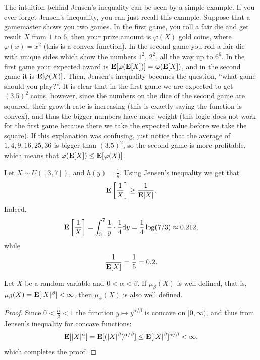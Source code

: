\documentclass[11pt,a4paper]{article}
\begin{document}
\begin{remark}
  The intuition behind Jensen's inequality can be seen by a simple
  example.
  If you ever forget Jensen's inequality, you can just recall this example.
  Suppose that a gamemaster shows you two games.
  In the first game, you roll a fair die and get result $X$ from $1$
  to $6$,
  then your prize amount is $\varphi(X)$ gold coins,
  where $\varphi(x) = x^2$ (this is a convex function).
  In the second game you roll a fair die with unique sides
  which show the numbers $1^2$, $2^2$, all the way up to $6^6$.
  In the first game your expected award is $\mathbf{E}[\varphi(\mathbf{E}[X])] = \varphi(\mathbf{E}[X])$,
  and in the second game it is $\mathbf{E}[\varphi(X)]$.
  Then, Jensen's inequality becomes the question,
  ``what game should you play?''.
  It is clear that in the first game we are expected to get $(3.5)^2$
  coins,
  however, since the numbers on the dice of the second game
  are squared, their growth rate is increasing
  (this is exactly saying the function is convex),
  and thus the bigger numbers have more weight
  (this logic does not work for the first game because there we
  take the expected value before we take the square).
  If this explanation was confusing,
  just notice that the average of $1,4,9,16,25,36$ is bigger than $(3.5)^2$,
  so the second game is more profitable,
  which means that $\varphi(\mathbf{E}[X]) \le \mathbf{E}[\varphi(X)]$.
\end{remark}

\begin{example}
  Let $X \sim U([3,7])$, and $h(y) = \frac{1}{y}$. Using Jensen's inequality
  we get that
  \[
    \mathbf{E}\left[{\frac{1}{X}}\right]\geq{\frac{1}{\mathbf{E}[X]}}.
  \]
  Indeed,
  \[
    \E \left[{\frac{1}{X}}\right] =
    \int_{3}^{7}{\frac{1}{y}}\cdot{\frac{1}{4}} \dy =
    \frac{1}{4} \log(7/3) \approx
    0.212,
  \]
  while
  \[
    \frac{1}{\mathbf{E}[X]} = \frac{1}{5} = 0.2.
  \]
\end{example}

\begin{corollary}
  Let $X$ be a random variable and $0 < \alpha < \beta$. 
  If $\mu_{\beta}(X)$ is well defined, 
  that is, $\mu_{\beta}(X) = \mathbf{E}[|X|^{\beta}] < \infty$,
  then $\mu_{\alpha}(X)$ is also well defined.
\end{corollary}
\begin{proof}
  Since $0 < \frac{\alpha}{\beta} < 1$ the function 
  $y \mapsto y^{\alpha/\beta}$ is concave on $[0,\infty)$, and thus from
  Jensen's inequality for concave functions:
  \[
    \mathbf{E}[|X|^{\alpha}] =
    \mathbf{E}[(|X|^{\beta})^{\alpha/\beta}] \leq
    \mathbf{E}[|X|^{\beta}]^{\alpha/\beta} <
    \infty,
  \]
  which completes the proof.
\end{proof}
\end{document}
